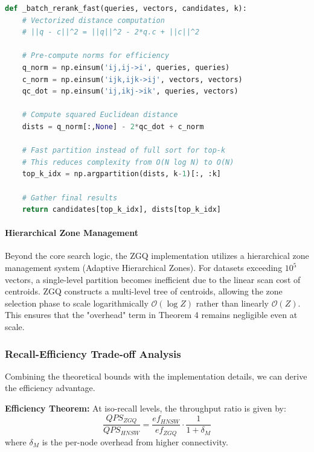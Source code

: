 \documentclass[conference]{IEEEtran}
\begin{document}
\begin{lstlisting}[language=Python, caption=Fast Batch Re-ranking, label=lst:rerank]
def _batch_rerank_fast(queries, vectors, candidates, k):
    # Vectorized distance computation
    # ||q - c||^2 = ||q||^2 - 2*q.c + ||c||^2
    
    # Pre-compute norms for efficiency
    q_norm = np.einsum('ij,ij->i', queries, queries)
    c_norm = np.einsum('ijk,ijk->ij', vectors, vectors)
    qc_dot = np.einsum('ij,ikj->ik', queries, vectors)
    
    # Compute squared Euclidean distance
    dists = q_norm[:,None] - 2*qc_dot + c_norm
    
    # Fast partition instead of full sort for top-k
    # This reduces complexity from O(N log N) to O(N)
    top_k_idx = np.argpartition(dists, k-1)[:, :k]
    
    # Gather final results
    return candidates[top_k_idx], dists[top_k_idx]
\end{lstlisting}

\paragraph{Hierarchical Zone Management}
Beyond the core search logic, the ZGQ implementation utilizes a hierarchical zone management system (Adaptive Hierarchical Zones). For datasets exceeding $10^5$ vectors, a single-level partition becomes inefficient due to the linear scan cost of centroids. ZGQ constructs a multi-level tree of centroids, allowing the zone selection phase to scale logarithmically $\mathcal{O}(\log Z)$ rather than linearly $\mathcal{O}(Z)$. This ensures that the "overhead" term in Theorem 4 remains negligible even at scale.

\subsubsection{Recall-Efficiency Trade-off Analysis}

Combining the theoretical bounds with the implementation details, we can derive the efficiency advantage.

\textbf{Efficiency Theorem:} At iso-recall levels, the throughput ratio is given by:
\begin{equation}
\frac{QPS_{ZGQ}}{QPS_{HNSW}} = \frac{ef_{HNSW}}{ef_{ZGQ}} \cdot \frac{1}{1 + \delta_M}
\end{equation}
where $\delta_M$ is the per-node overhead from higher connectivity.
\end{document}

